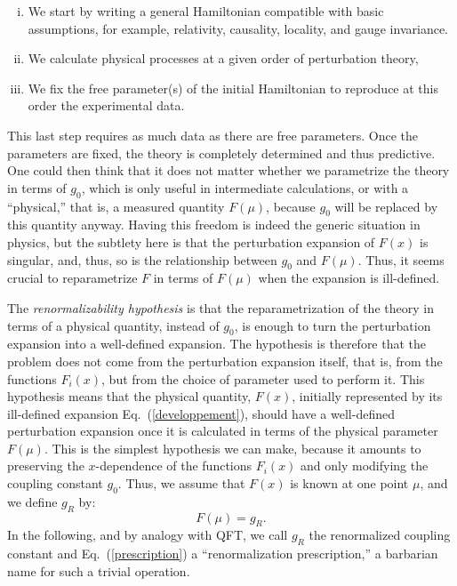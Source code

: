 \documentclass[floatfix,twocolumn,preprintnumbers,amsmath,amssymb,prb]{revtex4}
\begin{document}
\begin{enumerate}[(i)]

\item We start by writing
a general Hamiltonian compatible with basic 
assumptions, for example, relativity, causality, locality, and gauge
invariance.

\item We calculate physical processes at a given order of
perturbation theory, 

\item We fix the free parameter(s) of the initial Hamiltonian to
reproduce at this order the experimental data.

\end{enumerate}

This last step requires as much data as there are free parameters.
Once the parameters are fixed, the theory is completely determined
and thus predictive. One could then think that it does not matter
whether we parametrize the theory in terms of $g_0$, which
is only useful in intermediate calculations, or with a
``physical,'' that is, a measured quantity
$F(\mu)$, because $g_0$ will be replaced by this quantity anyway.
Having this freedom is indeed the generic situation in physics,
but the subtlety here is that the perturbation expansion of $F(x)$
is singular, and, thus, so is the relationship between $g_0$ and
$F(\mu)$. Thus, it seems crucial to reparametrize $F$ in terms of
$F(\mu)$ when the expansion is ill-defined.

The {\em renormalizability hypothesis} is 
that the reparametrization of the theory in terms of a physical
quantity, instead of $g_0$, is enough to turn the perturbation
expansion into a well-defined expansion. The hypothesis is
therefore that the problem does not come from the perturbation
expansion itself, that is, from the functions $F_i(x)$, but from
the choice of parameter used to perform it. This hypothesis 
means that the physical quantity, $F(x)$, initially represented by
its ill-defined expansion Eq.~(\ref{developpement}), should have a
well-defined perturbation expansion once it is calculated in terms
of the physical parameter
$F(\mu)$. This is the simplest hypothesis we can make, because
it amounts to preserving the $x$-dependence of the functions
$F_i(x)$ and only modifying the coupling constant $g_0$.
Thus, we assume that $F(x)$ is known at one point $\mu$, and we
define $g_R$ by:
\begin{equation}
F(\mu)=g_R.
\label{prescription}
\end{equation}
In the following, and by analogy
with QFT, we call $g_R$ the renormalized coupling constant
and Eq.~(\ref{prescription}) a ``renormalization prescription,'' a
barbarian name for such a trivial operation. 
\end{document}
